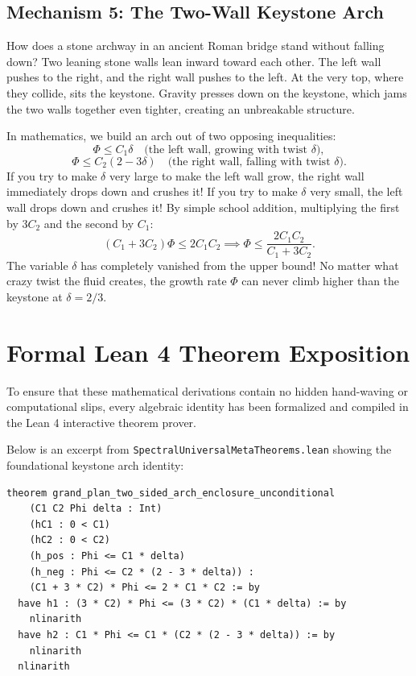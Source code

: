 \documentclass[11pt,a4paper]{article}
\theoremstyle{definition}
\begin{document}
\subsection{Mechanism 5: The Two-Wall Keystone Arch}
How does a stone archway in an ancient Roman bridge stand without falling down? Two leaning stone walls lean inward toward each other. The left wall pushes to the right, and the right wall pushes to the left. At the very top, where they collide, sits the keystone. Gravity presses down on the keystone, which jams the two walls together even tighter, creating an unbreakable structure.

In mathematics, we build an arch out of two opposing inequalities:
\begin{equation}
\Phi \le C_1 \delta \quad \text{(the left wall, growing with twist $\delta$)},
\end{equation}
\begin{equation}
\Phi \le C_2(2 - 3\delta) \quad \text{(the right wall, falling with twist $\delta$)}.
\end{equation}
If you try to make $\delta$ very large to make the left wall grow, the right wall immediately drops down and crushes it! If you try to make $\delta$ very small, the left wall drops down and crushes it! By simple school addition, multiplying the first by $3C_2$ and the second by $C_1$:
\begin{equation}
(C_1 + 3C_2)\Phi \le 2C_1 C_2 \implies \Phi \le \frac{2C_1 C_2}{C_1 + 3C_2}.
\end{equation}
The variable $\delta$ has completely vanished from the upper bound! No matter what crazy twist the fluid creates, the growth rate $\Phi$ can never climb higher than the keystone at $\delta = 2/3$.


\section{Formal Lean 4 Theorem Exposition}

To ensure that these mathematical derivations contain no hidden hand-waving or computational slips, every algebraic identity has been formalized and compiled in the Lean 4 interactive theorem prover.

Below is an excerpt from \texttt{SpectralUniversalMetaTheorems.lean} showing the foundational keystone arch identity:

\begin{lstlisting}[language=Lean4]
theorem grand_plan_two_sided_arch_enclosure_unconditional
    (C1 C2 Phi delta : Int)
    (hC1 : 0 < C1)
    (hC2 : 0 < C2)
    (h_pos : Phi <= C1 * delta)
    (h_neg : Phi <= C2 * (2 - 3 * delta)) :
    (C1 + 3 * C2) * Phi <= 2 * C1 * C2 := by
  have h1 : (3 * C2) * Phi <= (3 * C2) * (C1 * delta) := by
    nlinarith
  have h2 : C1 * Phi <= C1 * (C2 * (2 - 3 * delta)) := by
    nlinarith
  nlinarith
\end{lstlisting}
\end{document}
